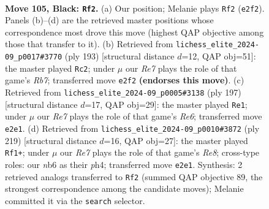 \documentclass[11pt]{article}
\begin{document}
\clearpage

\begin{figure}[p]\centering
\begin{subfigure}{0.46\textwidth}\centering
\resizebox{\linewidth}{!}{%
\newchessgame
\chessboard[
  setfen={8/R5pk/1N3p2/7p/7P/6PK/4r3/8 b - - 35 105},
  showmover=false,
  pgfstyle=straightmove, color=movearrow, markmove={e2-f2}
]}
\caption{}
\end{subfigure}\hfill
\begin{subfigure}{0.46\textwidth}\centering
\resizebox{\linewidth}{!}{%
\newchessgame
\chessboard[
  setfen={8/8/R5pk/7p/7P/6PK/1r6/8 b - - 31 97},
  showmover=false,
  pgfstyle=straightmove, color=movearrow, markmove={b2-c2}
]}
\caption{}
\end{subfigure}
\\[4pt]
\begin{subfigure}{0.46\textwidth}\centering
\resizebox{\linewidth}{!}{%
\newchessgame
\chessboard[
  setfen={8/4R2p/6pP/3k2P1/4p1K1/4r3/8/8 b - - 3 99},
  showmover=false,
  pgfstyle=straightmove, color=movearrow, markmove={e3-e1}
]}
\caption{}
\end{subfigure}\hfill
\begin{subfigure}{0.46\textwidth}\centering
\resizebox{\linewidth}{!}{%
\newchessgame
\chessboard[
  setfen={8/2R2pk1/6p1/4P3/5KPP/8/8/4r3 b - - 2 110},
  showmover=false,
  pgfstyle=straightmove, color=movearrow, markmove={e1-f1}
]}
\caption{}
\end{subfigure}
\caption{\textbf{Move 105, Black: \texttt{Rf2}.} (a) Our position; Melanie plays \texttt{Rf2} (\texttt{e2f2}). Panels (b)--(d) are the retrieved master positions whose correspondence most drove this move (highest QAP objective among those that transfer to it). (b) Retrieved from \texttt{lichess\_elite\_2024-09\_p0017\#3770} (ply 193) [structural distance $d$=12, QAP obj=51]: the master played \texttt{Rc2}; under $\mu$ our \emph{Re7} plays the role of that game's \emph{Rb7}; transferred move \texttt{e2f2} \textbf{(endorses this move)}. (c) Retrieved from \texttt{lichess\_elite\_2024-09\_p0005\#3138} (ply 197) [structural distance $d$=17, QAP obj=29]: the master played \texttt{Re1}; under $\mu$ our \emph{Re7} plays the role of that game's \emph{Re6}; transferred move \texttt{e2e1}. (d) Retrieved from \texttt{lichess\_elite\_2024-09\_p0010\#3872} (ply 219) [structural distance $d$=16, QAP obj=27]: the master played \texttt{Rf1+}; under $\mu$ our \emph{Re7} plays the role of that game's \emph{Re8}; cross-type roles: our \emph{n}b6 as their \emph{p}h4; transferred move \texttt{e2e1}. Synthesis: 2 retrieved analogs transferred to \texttt{Rf2} (summed QAP objective 89, the strongest correspondence among the candidate moves); Melanie committed it via the \texttt{search} selector.}
\label{fig:thought-m209}
\end{figure}
\end{document}
